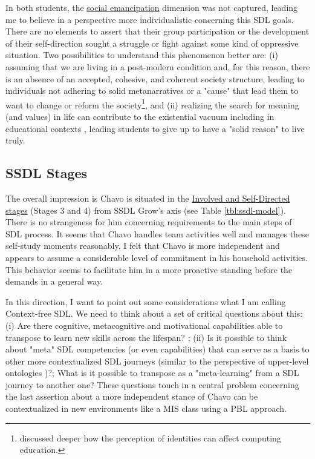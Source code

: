 In both students, the \underline{social emancipation} dimension was not captured, leading me to believe in a perspective more individualistic concerning this \gls{SDL} goals. There are no elements to assert that their group participation or the development of their self-direction sought a struggle or fight against some kind of oppressive situation. Two possibilities to understand this phenomenon better are: (i) assuming that we are living in a post-modern condition and, for this reason, there is an absence of an accepted, cohesive, and coherent society structure, leading to individuals not adhering to solid metanarratives or a "cause" that lead them to want to change or reform the society\footnote{ discussed deeper how the perception of identities can affect computing education.}, and (ii) realizing the search for meaning (and values) in life can contribute to the existential vacuum including in educational contexts \cite{csanli:2021}, leading students to give up to have a "solid reason" to live truly.

\subsection{SSDL Stages}
\label{disc-ss:staged-sdl}

The overall impression is Chavo is situated in the \underline{Involved and Self-Directed stages} (Stages 3 and 4) from \gls{SSDL} Grow's axis (see Table \ref{tbl:ssdl-model}). There is no strangeness for him concerning requirements to the main steps of \gls{SDL} process. It seems that Chavo handles team activities well and manages these self-study moments reasonably. I felt that Chavo is more independent and appears to assume a considerable level of commitment in his household activities. This behavior seems to facilitate him in a more proactive standing before the demands in a general way. 

In this direction, I want to point out some considerations what I am calling Context-free \gls{SDL}. We need to think about a set of  critical questions about this: (i) Are there cognitive,  metacognitive and motivational capabilities able to transpose to learn new skills across the lifespan? \cite{sheffler:2022}; (ii) Is it possible to think about "meta" \gls{SDL} competencies (or even capabilities) that can serve as a basis to other more contextualized \gls{SDL} journeys (similar to the perspective of upper-level ontologies \cite{niles:2001})?; What is it possible to transpose as a "meta-learning" from a \gls{SDL} journey to another one? These questions touch in a central problem concerning the last assertion about a more independent stance of Chavo can be contextualized in new environments like a \acrfull{MIS} class using a \acrfull{PBL} approach.


